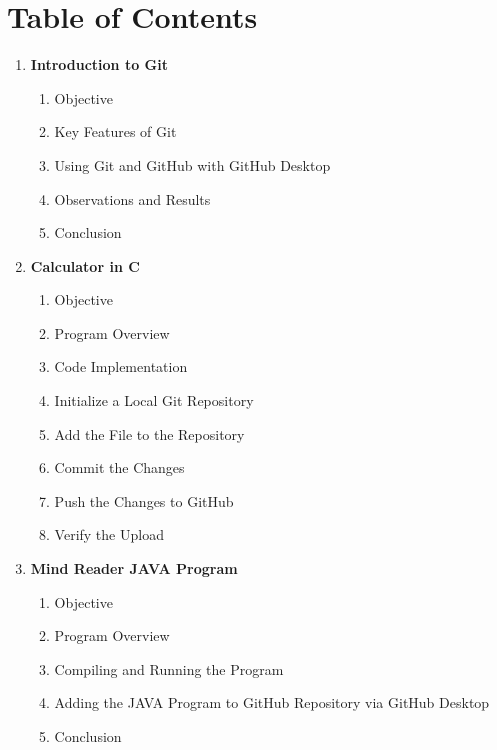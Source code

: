 \section*{Table of Contents}

\begin{enumerate}
    \item \textbf{Introduction to Git}
    \begin{enumerate}
        \renewcommand{\labelenumii}{\arabic{enumi}.\arabic{enumii}}
        \item Objective
        \item Key Features of Git
        \item Using Git and GitHub with GitHub Desktop
        \item Observations and Results
        \item Conclusion
    \end{enumerate}

    \item \textbf{Calculator in C}
    \begin{enumerate}
        \renewcommand{\labelenumii}{\arabic{enumi}.\arabic{enumii}}
        \item Objective
        \item Program Overview
        \item Code Implementation
        \item Initialize a Local Git Repository
        \item Add the File to the Repository
        \item Commit the Changes
        \item Push the Changes to GitHub
        \item Verify the Upload
    \end{enumerate}

    \item \textbf{Mind Reader JAVA Program}
    \begin{enumerate}
        \renewcommand{\labelenumii}{\arabic{enumi}.\arabic{enumii}}
        \item Objective
        \item Program Overview
        \item Compiling and Running the Program
        \item Adding the JAVA Program to GitHub Repository via GitHub Desktop
        \item Conclusion
    \end{enumerate}


\end{enumerate}
